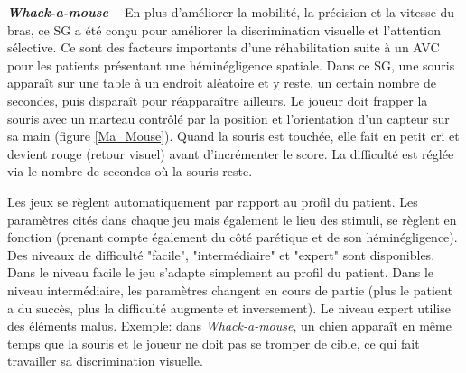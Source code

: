 		\textbf{\textit{Whack-a-mouse} --} En plus d'améliorer la mobilité, la précision et la vitesse du bras, ce SG a été conçu pour améliorer la discrimination visuelle et l'attention sélective. Ce sont des facteurs importants d'une réhabilitation suite à un AVC pour les patients présentant une héminégligence spatiale. Dans ce SG, une souris apparaît sur une table à un endroit aléatoire et y reste, un certain nombre de secondes, puis disparaît pour réapparaître ailleurs. Le joueur doit frapper la souris avec un marteau contrôlé par la position et l'orientation d'un capteur sur sa main (figure \ref{Ma_Mouse}). Quand la souris est touchée, elle fait en petit cri et devient rouge (retour visuel) avant d'incrémenter le score. La difficulté est réglée via le nombre de secondes où la souris reste.

		\begin{minipage}{\linewidth}
			\label{Ma_Mouse}
		\end{minipage}\medskip

		Les jeux se règlent automatiquement par rapport au profil du patient. Les paramètres cités dans chaque jeu mais également le lieu des stimuli, se règlent en fonction (prenant compte également du côté parétique et de son héminégligence). Des niveaux de difficulté "facile", "intermédiaire" et "expert" sont disponibles. Dans le niveau facile le jeu s'adapte simplement au profil du patient. Dans le niveau intermédiaire, les paramètres changent en cours de partie (plus le patient a du succès, plus la difficulté augmente et inversement). Le niveau expert utilise des éléments malus. Exemple: dans \textit{Whack-a-mouse}, un chien apparaît en même temps que la souris et le joueur ne doit pas se tromper de cible, ce qui fait travailler sa discrimination visuelle.
		\\
		

